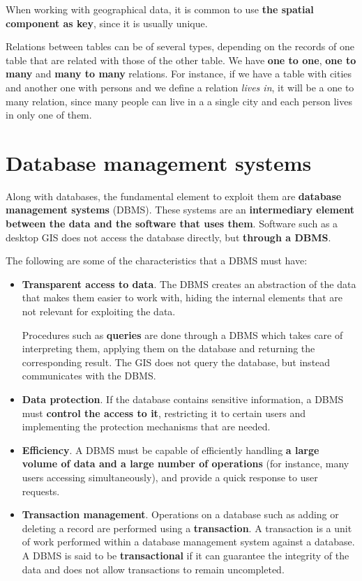 When working with geographical data, it is common to use \textbf{the spatial component as key}, since it is usually unique.

Relations between tables can be of several types, depending on the records of one table that are related with those of the other table. We have \textbf{one to one}, \textbf{one to many} and \textbf{many to many} relations. For instance, if we have a table with cities and another one with persons and we define a relation \emph{lives in}, it will be a one to many relation, since many people can live in a a single city and each person lives in only one of them.


\section{Database management systems}

Along with databases, the fundamental element to exploit them are \textbf{database management systems} (DBMS). These systems are an \textbf{intermediary element between the data and the software that uses them}. Software such as a desktop GIS does not access the database directly, but \textbf{through a DBMS}.

The following are some of the characteristics that a DBMS must have:

\begin{itemize}
	\item \textbf{Transparent access to data}. The DBMS creates an abstraction of the data that makes them easier to work with, hiding the internal elements that are not relevant for exploiting the data.

	Procedures such as \textbf{queries} are done through a DBMS which takes care of interpreting them, applying them on the database and returning the corresponding result. The GIS does not query the database, but instead communicates with the DBMS.
	\item \textbf{Data protection}. If the database contains sensitive information, a DBMS must \textbf{control the access to it}, restricting it to certain users and implementing the protection mechanisms that are needed.
	\item \textbf{Efficiency}. A DBMS must be capable of efficiently handling \textbf{a large volume of data and a large number of operations} (for instance, many users accessing simultaneously), and provide a quick response to user requests.
	\item \textbf{Transaction management}. Operations on a database such as adding or deleting a record are performed using a \textbf{transaction}. A transaction is a unit of work performed within a database management system against a database. A DBMS is said to be \textbf{transactional} if it can guarantee the integrity of the data and does not allow transactions to remain uncompleted. 

\end{itemize}

